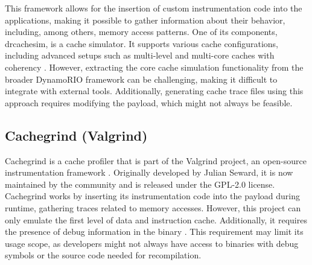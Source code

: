 This framework allows for the insertion of custom instrumentation code into the applications, making it possible to gather information about their behavior, including, among others,
memory access patterns. One of its components, drcachesim, is a cache simulator. It supports various cache configurations, including advanced setups such as multi-level and
multi-core caches with coherency \cite{drcachesim}. However, extracting the core cache simulation functionality from the broader DynamoRIO framework can be challenging, making it
difficult to integrate with external tools. Additionally, generating cache trace files using this approach requires modifying the payload, which might not always be feasible.

\subsection{Cachegrind (Valgrind)}

Cachegrind is a cache profiler that is part of the Valgrind project, an open-source instrumentation framework \cite{valgrind}. Originally developed by Julian Seward, it is now
maintained by the community \cite{valgrinddevelopers} and is released under the GPL-2.0 license.
Cachegrind works by inserting its instrumentation code into the payload during runtime, gathering traces related to memory accesses.
However, this project can only emulate the first level of data and instruction cache. Additionally, it requires the presence of debug information in the binary
\cite{cachegrinddocs}. This requirement may limit its usage scope, as developers might not always have access to binaries with debug symbols or the source code needed for
recompilation.
